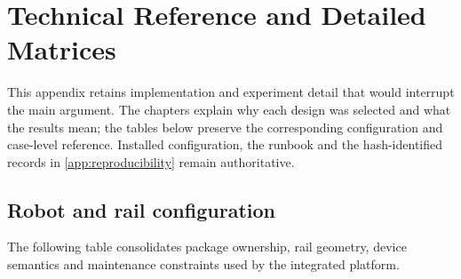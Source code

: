 \chapter{Technical Reference and Detailed Matrices}
\label{app:technical}

This appendix retains implementation and experiment detail that would interrupt
the main argument. The chapters explain why each design was selected and what
the results mean; the tables below preserve the corresponding configuration and
case-level reference. Installed configuration, the runbook and the
hash-identified records in \cref{app:reproducibility} remain authoritative.

\section{Robot and rail configuration}

The following table consolidates package ownership, rail geometry, device
semantics and maintenance constraints used by the integrated platform.

